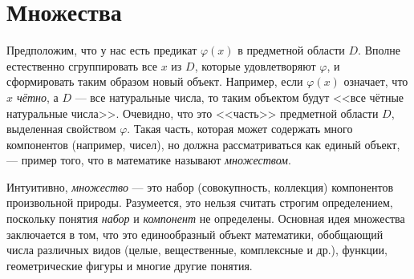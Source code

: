 \documentclass[12pt,notitlepage]{article}
\theoremstyle{plain}
\theoremstyle{definition}
\theoremstyle{plain}
\newcommand{\N}{\mathbb{N}}
\renewcommand{\phi}{\varphi}
\newcommand{\1}{\mathbf{1}}
\newcommand{\0}{\mathbf{0}}
\newcommand{\mcomm}[1]{}
\begin{document}
\section{Множества}
\mcomm{This section (besides its foundational and formalism-related contents) tries to introduce some `axiomatic thinking'. In this respect, it continues the line of the previous one (being totally independent thereof). In general, the axiomatic approach is painful for many students, since they are used to giving too much credit to their intuition and do not take axioms nor definitions seriously. In the case of sets, their intuition is most likely rigidly fixed to Euler diagrams etc., where one can clearly see two object types: `elements' and `sets'. This is, of course, inadequate for any interesting set-theoretic construction, like union or binary relation. As we want our presentation of `Discrete Mathematics' to be quite rigorous, this is unacceptable for us; therefore have we made this bitter `axiomatic pill' for our students. In practice, we however give it them \emph{after} more concrete and intuitive chapters on natural number induction and elementary arithmetic.
	\medskip\\
	Technically, we define set equality in terms of ${\in}$ with the Extensionality Axiom, give four set existence axioms (Pairing, Specification, Powerset, and Union) from ZF, and the Axiom of Foundation (as if we had the Axiom of Choice). We then use these to obtain all the `high school set theory' without much reference to intuition. In this Course, we neither give an explicit definition for the set $\N$ nor the Axiom of Infinity, nor we state any other axiom of ZFC. Throughout the Course, a few statements depend on the Axiom of Choice but we omit their proofs altogether.
}

Предположим, что у нас есть предикат $\phi(x)$ в предметной области $D$. Вполне естественно сгруппировать все $x$ из $D$, которые удовлетворяют $\phi$, и сформировать таким образом новый объект. Например, если $\phi(x)$ означает, что \emph{$x$ чётно}, а $D$ --- все натуральные числа, то таким объектом будут <<все чётные натуральные числа>>. Очевидно, что это <<часть>> предметной области $D$, выделенная свойством $\phi$.
Такая часть, которая может содержать много компонентов (например, чисел), но должна рассматриваться как единый объект, --- пример того, что в математике называют \emph{множеством}.

Интуитивно, \emph{множество} --- это набор (совокупность, коллекция) компонентов произвольной природы. Разумеется, это нельзя считать строгим определением, поскольку понятия \emph{набор} и \emph{компонент} не определены. Основная идея множества заключается в том, что это единообразный объект математики, обобщающий числа различных видов (целые, вещественные, комплексные и др.), функции, геометрические фигуры и многие другие понятия.
\end{document}
